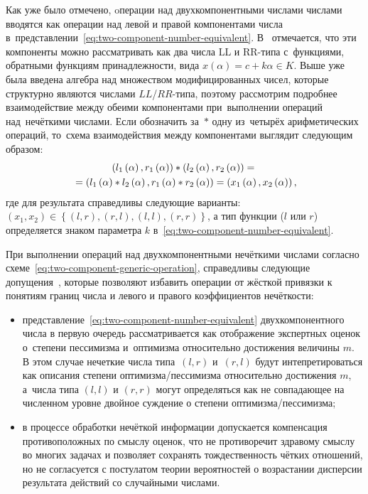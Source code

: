 Как уже было отмечено, oперации над двухкомпонентными числами числами вводятся как операции над левой и правой компонентами числа в~представлении~\eqref{eq:two-component-number-equivalent}. В~\cite{Kanischeva} отмечается, что эти компоненты можно рассматривать как два числа LL и RR-типа с~функциями, обратными функциям принадлежности, вида $x\left(\alpha \right)=c+k\alpha \in K$. Выше уже была введена алгебра над множеством модифицированных чисел, которые структурно являются числами $LL$/$RR$-типа, поэтому рассмотрим подробнее взаимодействие между обеими компонентами при~выполнении операций над~нечёткими числами. Если обозначить за~$*$ одну из~четырёх арифметических операций, то~схема взаимодействия между компонентами выглядит следующим образом:
\begin{gather}
  \left( l_1\left(\alpha \right), r_1 \left(\alpha \right) \right) * \left(l_2\left(\alpha \right), r_2\left(\alpha \right) \right) = {}\notag \\
  \label{eq:two-component-generic-operation}
  {}=\left(l_1\left(\alpha \right)*l_2\left(\alpha \right), r_1\left(\alpha \right)*r_2\left(\alpha \right) \right) = \left(x_1\left(\alpha \right), x_2\left(\alpha \right) \right),
\end{gather}
где для результата справедливы следующие варианты: $\left(x_1, x_2 \right) \in \left\{ \left(l, r \right), \left(r, l \right),\allowbreak \left(l, l \right), \left(r, r \right) \right\}$, а тип функции ($l$ или $r$) определяется знаком параметра $k$ в~\eqref{eq:two-component-number-equivalent}.

При выполнении операций над двухкомпонентными нечёткими числами  согласно схеме~\eqref{eq:two-component-generic-operation}, справедливы следующие допущения~\cite{Kanischeva}, которые позволяют избавить операции от жёсткой привязки к понятиям границ числа и левого и правого коэффициентов нечёткости:
\begin{itemize}
  \item представление~\eqref{eq:two-component-number-equivalent} двухкомпонентного числа в первую очередь рассматривается как отображение экспертных оценок о~степени пессимизма и~оптимизма относительно достижения величины $m$. В этом случае нечеткие числа типа~$\left(l, r \right)$ и~$\left(r, l \right)$ будут интепретироваться как описания степени оптимизма/пессимизма относительно достижения $m$, а~числа типа $\left(l, l \right)$ и $\left(r, r \right)$ могут определяться как не совпадающее на численном уровне двойное суждение о степени оптимизма/пессимизма;
  \item в процессе обработки нечёткой информации допускается компенсация противоположных по смыслу оценок, что не противоречит здравому смыслу во многих задачах и позволяет сохранять тождественность чётких отношений, но не согласуется с постулатом теории вероятностей о возрастании дисперсии результата действий со случайными числами.
\end{itemize}

